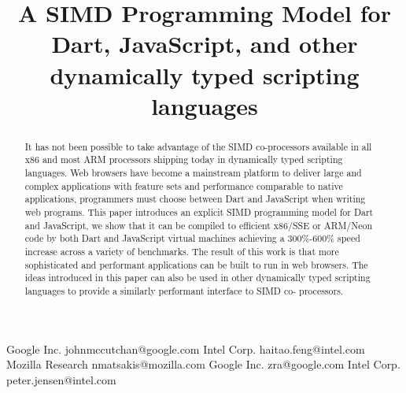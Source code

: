 \documentclass{sigplanconf}
\begin{document}
\setlength{\pdfpageheight}{\paperheight}
\setlength{\pdfpagewidth}{\paperwidth}




\title{A SIMD Programming Model for Dart, JavaScript, and other dynamically typed scripting languages}

           {Google Inc.}
           {johnmccutchan@google.com}
           {Intel Corp.}
           {haitao.feng@intel.com}
           {Mozilla Research}
           {nmatsakis@mozilla.com}
           {Google Inc.}
           {zra@google.com}
           {Intel Corp.}
           {peter.jensen@intel.com}

\maketitle

\begin{abstract}

It has not been possible to take advantage of the SIMD co-processors available
in all x86 and most ARM processors shipping today in dynamically typed scripting
languages. Web browsers have become a mainstream platform to deliver large and
complex applications with feature sets and performance comparable to native
applications, programmers must choose between Dart and JavaScript when writing
web programs. This paper introduces an explicit SIMD programming model for Dart
and JavaScript, we show that it can be compiled to efficient x86/SSE or ARM/Neon
code by both Dart and JavaScript virtual machines achieving a 300\%-600\% speed
increase across a variety of benchmarks. The result of this work is that more
sophisticated and performant applications can be built to run in web browsers.
The ideas introduced in this paper can also be used in other dynamically typed
scripting languages to provide a similarly performant interface to SIMD co-
processors.

\end{abstract}
\end{document}
